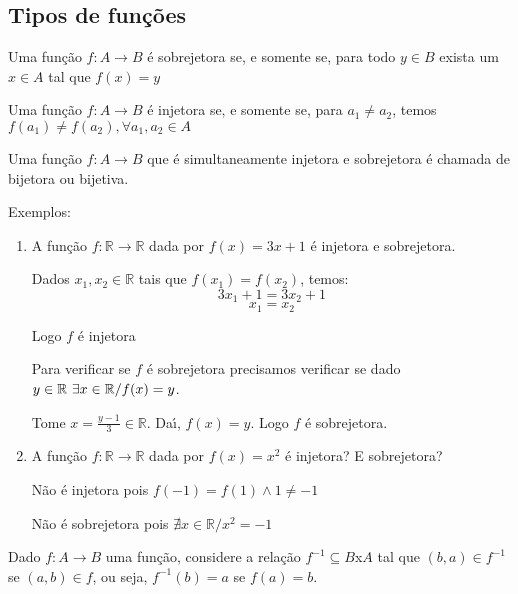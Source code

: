 \subsection{Tipos de fun{\c c}{\~o}es}

\begin{definicao}  Uma fun{\c c}{\~a}o $f:A\rightarrow B$ {\'e} sobrejetora se, e somente se, para todo $y\in B$ exista um $x\in A$ tal que $f(x)=y$\end{definicao}

\begin{definicao} Uma fun{\c c}{\~a}o $f:A\rightarrow B$ {\'e} injetora se, e somente se, para $a_{1}\neq a_{2}$, temos $f(a_{1})\neq f(a_{2}), \forall a_{1},a_{2}\in A$\end{definicao}

\begin{definicao} Uma fun{\c c}{\~a}o $f:A\rightarrow B$ que {\'e} simultaneamente injetora e sobrejetora {\'e} chamada de bijetora ou bijetiva.
\end{definicao}

Exemplos:
\begin{enumerate}
\item A fun{\c c}{\~a}o $f:\mathbb{R}\rightarrow\mathbb{R}$ dada por $f(x)=3x+1$ {\'e} injetora e sobrejetora.

Dados $x_{1}, x_{2}\in\mathbb{R}$ tais que $f(x_{1})=f(x_{2})$, temos:
\[3x_{1}+1=3x_{2}+1\]
\[x_{1}=x_{2}\]

Logo $f$ {\'e} injetora

Para verificar se $f$ {\'e} sobrejetora precisamos verificar se dado $y\in\mathbb{R}\\ \ \exists x\in\mathbb{R}/f(x)=y$.

Tome $x=\displaystyle\frac{y-1}{3}\in\mathbb{R}$. Da{\'\i}, $f(x)=y$. Logo $f$ {\'e} sobrejetora.
\item A fun{\c c}{\~a}o $f:\mathbb{R}\rightarrow\mathbb{R}$ dada por $f(x)=x^{2}$ {\'e} injetora? E sobrejetora?

N{\~a}o {\'e} injetora pois $f(-1)=f(1)\wedge 1\neq -1$

N{\~a}o {\'e} sobrejetora pois $\nexists x\in\mathbb{R}/x^{2}=-1$

\end{enumerate}

Dado $f:A\rightarrow B$ uma fun{\c c}{\~a}o, considere a rela{\c c}{\~a}o $f^{-1}\subseteq B$x$A$ tal que $(b,a)\in f^{-1}$ se $(a,b)\in f$, ou seja, $f^{-1}(b)=a$ se $f(a)=b$.

